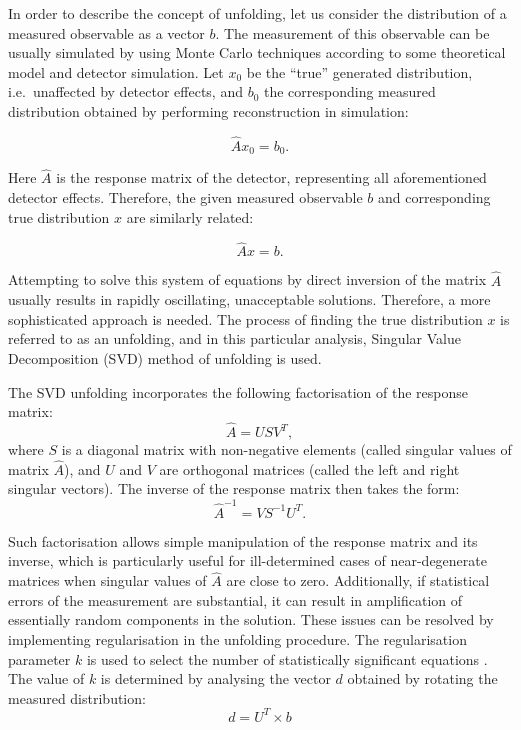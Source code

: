 In order to describe the concept of unfolding, let us consider the distribution of a measured observable as a vector
$b$. The measurement of this observable can be usually simulated by using Monte Carlo techniques according to some
theoretical model and detector simulation. Let $x_0$ be the ``true'' generated distribution, i.e.\ unaffected by
detector effects, and $b_0$ the corresponding measured distribution obtained by performing reconstruction in simulation:

\begin{equation}
\label{eq:unfolding_MC}
\hat{A} x_0 = b_0.
\end{equation}

Here $\hat{A}$ is the response matrix of the detector, representing all aforementioned detector effects. Therefore,
the given measured observable $b$ and corresponding true distribution $x$ are similarly related:

\begin{equation}
\label{eq:unfolding_data}
\hat{A} x = b.
\end{equation}

Attempting to solve this system of equations by direct inversion of the matrix $\hat{A}$ usually results in rapidly
oscillating, unacceptable solutions. Therefore, a more sophisticated approach is needed. The process of finding the true
distribution $x$ is referred to as an unfolding, and in this particular analysis, Singular Value Decomposition (SVD)
method of unfolding \autocite{SVD_unfolding} is used.

The SVD unfolding incorporates the following factorisation of the response matrix:
\begin{equation}
\hat{A} = USV^T,
\end{equation}
where $S$ is a diagonal matrix with non-negative elements (called singular values of matrix $\hat{A}$), and $U$ and $V$
are orthogonal matrices (called the left and right singular vectors). The inverse of the response matrix then takes the
form:
\begin{equation}
\hat{A}^{-1} = VS^{-1}U^T.
\label{eq:inverse_response}
\end{equation}

Such factorisation allows simple manipulation of the response matrix and its inverse, which is particularly useful for
ill-determined cases of near-degenerate matrices when singular values of $\hat{A}$ are close to zero. Additionally, if
statistical errors of the measurement are substantial, it can result in amplification of essentially random components
in the solution. These issues can be resolved by implementing regularisation in the unfolding procedure. The
regularisation parameter $k$ is used to select the number of statistically significant equations
\autocite{SVD_unfolding}. The value of $k$ is determined by analysing the vector $d$ obtained by rotating the measured
distribution:
\begin{equation}
d = U^T \times b
\end{equation}

